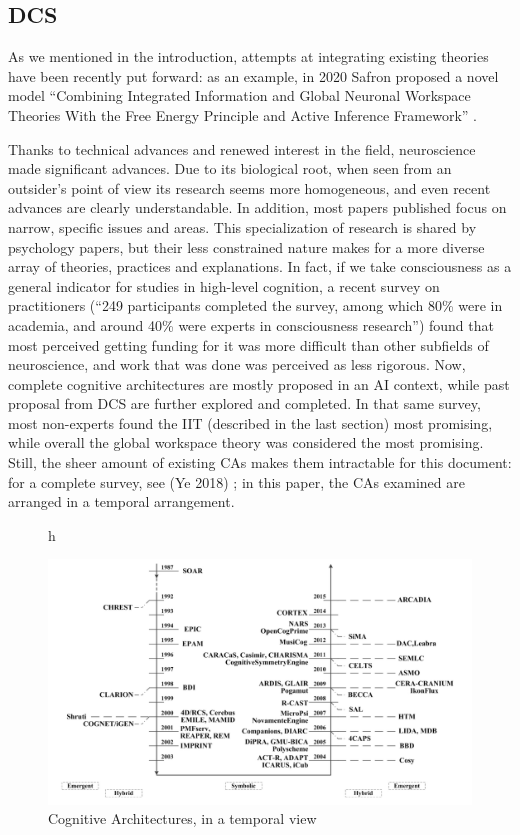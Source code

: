 \documentclass[../main.tex]{subfiles}
\begin{document}
\subsection{DCS}
As we mentioned in the introduction, attempts at integrating existing theories have been recently put forward: as an example, in 2020 Safron proposed a novel model ``Combining Integrated Information and Global Neuronal Workspace Theories With the Free Energy Principle and Active Inference Framework'' \parencite{safronIntegratedWorldModeling2020}.


Thanks to technical advances and renewed interest in the field, neuroscience made significant advances. Due to its biological root, when seen from an outsider's point of view its research seems more homogeneous, and even recent advances are clearly understandable. In addition, most papers published focus on narrow, specific issues and areas. This specialization of research is shared by psychology papers, but their less constrained nature makes for a more diverse array of theories, practices and explanations. In fact, if we take consciousness as a general indicator for studies in high-level cognition, a recent survey \parencite{michelInformalInternetSurvey2018} on practitioners (``249 participants completed the survey, among which 80\% were in academia, and around 40\% were experts in consciousness research'') found that most perceived getting funding for it was more difficult than other subfields of neuroscience, and work that was done was perceived as less rigorous. Now, complete cognitive architectures are mostly proposed in an AI context, while past proposal from DCS are further explored and completed. In that same survey, most non-experts found the IIT (described in the last section) most promising, while overall the global workspace theory was considered the most promising. Still, the sheer amount of existing CAs makes them intractable for this document: for a complete survey, see (Ye 2018) \parencite{yeSurveyCognitiveArchitectures2018}; in this paper, the CAs examined are arranged in a temporal arrangement.

\begin{figure}{h}
    \caption{Cognitive Architectures, in a temporal view \parencite{yeSurveyCognitiveArchitectures2018} }
    \includegraphics[width=\textwidth]{img/CAs.png}
\end{figure}
\end{document}
